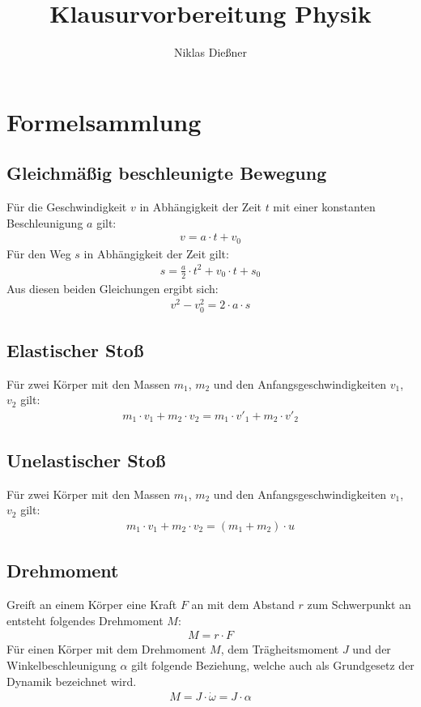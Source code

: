 \documentclass{article}
\begin{document}
	\title{Klausurvorbereitung Physik}
	\author{Niklas Dießner}
	
	\maketitle
	\thispagestyle{empty}	
	\newpage
	
	\tableofcontents
	\newpage
	
	\section{Formelsammlung}
	\subsection*{Gleichmäßig beschleunigte Bewegung}
	Für die Geschwindigkeit $v$ in Abhängigkeit der Zeit $t$ mit einer konstanten Beschleunigung $a$ gilt:
	\begin{align*}
		v=a\cdot t+v_0
	\end{align*}
	Für den Weg $s$ in Abhängigkeit der Zeit gilt:
	\begin{align*}
		s=\frac{a}{2}\cdot t^2+v_0\cdot t+s_0
	\end{align*}
	Aus diesen beiden Gleichungen ergibt sich:
	\begin{align*}
		v^2-v_0^2=2\cdot a\cdot s
	\end{align*}
	\subsection*{Elastischer Stoß}
	Für zwei Körper mit den Massen $m_1$, $m_2$ und den Anfangsgeschwindigkeiten $v_1$, $v_2$ gilt:
	\begin{align*}
		m_1\cdot v_1+m_2\cdot v_2=m_1\cdot v'_1+m_2\cdot v'_2
	\end{align*}
	\subsection*{Unelastischer Stoß}
	Für zwei Körper mit den Massen $m_1$, $m_2$ und den Anfangsgeschwindigkeiten $v_1$, $v_2$ gilt:
	\begin{align*}
		m_1\cdot v_1+m_2\cdot v_2=(m_1+m_2)\cdot u
	\end{align*}
	\subsection*{Drehmoment}
	Greift an einem Körper eine Kraft $F$ an mit dem Abstand $r$ zum Schwerpunkt an entsteht folgendes Drehmoment $M$:
	\begin{align*}
		M=r\cdot F
	\end{align*}
	Für einen Körper mit dem Drehmoment $M$, dem Trägheitsmoment $J$ und der Winkelbeschleunigung $\alpha$ gilt folgende Beziehung, welche auch als Grundgesetz der Dynamik bezeichnet wird.
	\begin{align*}
		M=J\cdot \dot{\omega}=J\cdot \alpha
	\end{align*}
\end{document}
